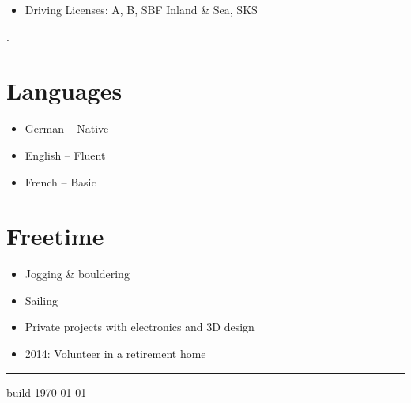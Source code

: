 \documentclass[a4paper,11pt]{article}
\newcommand{\col}[2]{\textcolor[HTML]{#1}{#2}}
\begin{document}
\begin{minipage}[t]{0.65\textwidth}
\begin{minipage}[t]{0.625\textwidth}
\begin{itemize}
            \item Driving Licenses: A, B, SBF Inland \& Sea, SKS
        \end{itemize}
    \end{minipage}
    \hfill
    \begin{minipage}[t]{0.325\textwidth}
        \col{ffffff}{.} %
        \section*{\col{7690bb}{Languages}}
        \begin{itemize}
            \small
            \item German -- Native
            \item English -- Fluent
            \item French -- Basic
        \end{itemize}

        \section*{\col{6187bd}{Freetime}}
        \begin{itemize}
            \small
            \item Jogging \& bouldering
            \item Sailing
            \item Private projects with electronics and 3D design
            \item 2014: Volunteer in a retirement home
        \end{itemize}
    \end{minipage}

\end{minipage}

\vfill
\hfill
\vspace{0.17cm}
\begin{minipage}[t]{0.65\textwidth}
    \hrule
    \vspace{0.125cm}

    \small build \href{\giturl}{\texttt{\gitcommit}} \hfill \today
\end{minipage}
\end{document}
